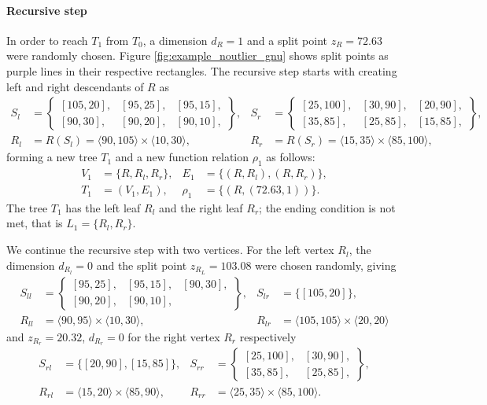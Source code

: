 \begin{example}
\paragraph{Recursive step} 
In order to reach $T_1$ from $T_0$, a dimension $d_R=1$ and a split point $z_R = 72.63$ were randomly chosen. Figure \ref{fig:example_noutlier_gnu} shows split points as purple lines in their respective rectangles. The recursive step starts with creating left and right descendants of $R$ as
\begin{align*}
 S_l & = \left\{\begin{smallmatrix}
 [105,20],& [95,25], &[95,15],\\
[90,30],&[90,20],&[90,10],
\end{smallmatrix}\right\},&
S_r &= \left\{\begin{smallmatrix}
    [25,100],&[30,90],&[20,90],\\
    [35,85], &[25,85],&[15,85],
\end{smallmatrix}\right\},\\
R_l &= R(S_l) = \langle 90, 105 \rangle \times \langle 10, 30 \rangle,&
R_r &= R(S_r) = \langle 15, 35 \rangle \times \langle 85, 100 \rangle,
\end{align*}
forming a new tree $T_1$ and a new function relation $\rho_1$ as follows:
\begin{align*}
V_1 &= \{R, R_l, R_r\},&
E_1 &= \{(R,R_l), (R,R_r)\},\\
T_1 &= (V_1, E_1),&
\rho_1 &= \{ (R, (72.63, 1))\}.
\end{align*}
The tree $T_1$ has the left leaf $R_l$ and the right leaf $R_r$; the ending condition is not met, that is $L_1 = \{R_l,R_r\}$. 

We continue the recursive step with two vertices.
For the left vertex $R_l$, the dimension $d_{R_l} =0$ and the split point $z_{R_L}= 103.08$ were chosen randomly, giving
\begin{align*}
S_{ll} &= \left\{\begin{smallmatrix}
    [95,25],& [95,15], &[90,30],\\
    [90,20],& [90,10],
\end{smallmatrix}\right\},&
S_{lr} &= \{[105,20]\},\\
R_{ll} &= \langle 90, 95 \rangle \times \langle 10, 30\rangle,&
R_{lr} &= \langle 105, 105 \rangle \times \langle 20, 20\rangle
\end{align*}
and $z_{R_r}= 20.32$, $d_{R_r} = 0$ for the right vertex $R_r$ respectively
\begin{align*}
S_{rl}&= \{[20,90],[15,85]\},&
S_{rr} &= \left\{\begin{smallmatrix}
    [25, 100],& [30,90],\\
    [35,85],& [25,85],
\end{smallmatrix}\right\},\\
R_{rl}&= \langle 15, 20 \rangle \times \langle 85, 90 \rangle,&
R_{rr}&= \langle 25, 35 \rangle \times \langle 85, 100 \rangle.
\end{align*}


\end{example}
